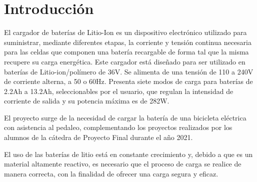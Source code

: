 \section{Introducción}






El cargador de baterías de Litio-Ion es un dispositivo electrónico utilizado para suministrar, mediante diferentes etapas, la corriente y tensión continua necesaria para las celdas que componen una batería recargable de forma tal que la misma recupere su carga energética.
Este cargador está diseñado para ser utilizado en baterías de Litio-ion/polímero de 36V. Se alimenta de una tensión de 110 a 240V de corriente alterna, a 50 o 60Hz. Presenta siete modos de carga para baterías de 2.2Ah a 13.2Ah, seleccionables por el usuario, que regulan la intensidad de corriente de salida y su potencia máxima es de 282W.

El proyecto surge de la necesidad de cargar la batería de una bicicleta eléctrica con asistencia al pedaleo,
complementando los proyectos realizados por los alumnos de la cátedra de Proyecto Final durante el año 2021.

El uso de las baterías de litio está en constante crecimiento y,
debido a que es un material altamente reactivo,
es necesario que el proceso de carga se realice de manera correcta,
con la finalidad de ofrecer una carga segura y eficaz.